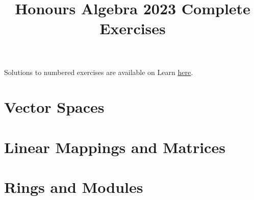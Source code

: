 \documentclass[a4paper]{article}
\title{Honours Algebra 2023 Complete Exercises}
\begin{document}
\maketitle

Solutions to numbered exercises are available on Learn \href{https://www.learn.ed.ac.uk/bbcswebdav/pid-8338476-dt-content-rid-33823325_1/xid-33823325_1}{here}.

\begin{enumerate}
  \section{Vector Spaces}
    
    
    
    
    
    

  \newpage
  \section{Linear Mappings and Matrices}
    
    
    
    

  \newpage
  \section{Rings and Modules}
    
    
    
    
    
    
\end{enumerate}
\end{document}
